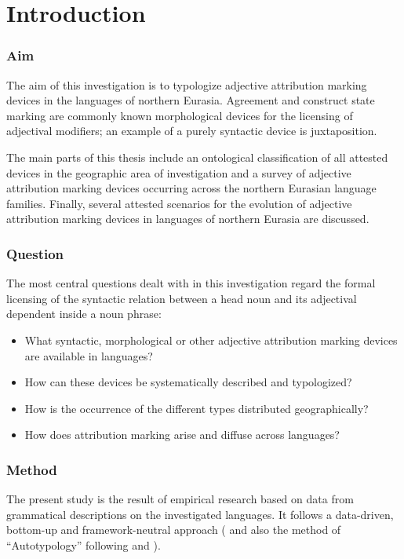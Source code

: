 
\chapter{Introduction}
\subsection*{Aim}
The aim of this investigation is to typologize adjective attribution marking devices in the languages of northern Eurasia. Agreement and construct state marking are commonly known morphological devices for the licensing of adjectival modifiers; an example of a purely syntactic device is juxtaposition.  

The main parts of this thesis include an ontological classification of all attested devices in the geographic area of investigation and a survey of adjective attribution marking devices occurring across the northern Eurasian language families. Finally, several attested scenarios for the evolution of adjective attribution marking devices in languages of northern Eurasia are discussed.

\subsection*{Question}
The most central questions dealt with in this investigation regard the formal licensing of the syntactic relation between a head noun and its adjectival dependent inside a noun phrase:
\begin{itemize}
\item What syntactic, morphological or other adjective attribution marking devices are available in languages? 
\item How can these devices be systematically described and typologized? 
\item How is the occurrence of the different types distributed geographically? 
\item How does attribution marking arise and diffuse across languages?
\end{itemize}

\subsection*{Method}
The present study is the result of empirical research based on data from grammatical descriptions on the investigated languages. It follows a data-driven, bottom-up and framework-neutral approach (\citealt[cf.][]{haspelmath2010} and also the method of “Autotypology” following \citealt{bickel-etal2002} and \citealt{bickel2007}).

